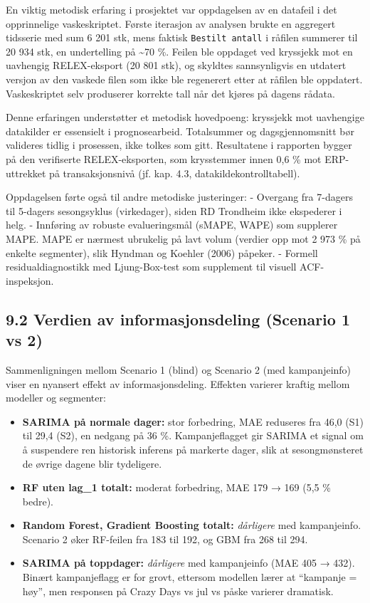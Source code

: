 \documentclass[
  norsk,
  11pt,
  a4paper,
]{article}
\providecommand{\tightlist}{%
  \setlength{\itemsep}{0pt}\setlength{\parskip}{0pt}}
\begin{document}
En viktig metodisk erfaring i prosjektet var oppdagelsen av en datafeil
i det opprinnelige vaskeskriptet. Første iterasjon av analysen brukte en
aggregert tidsserie med sum 6 201 stk, mens faktisk
\texttt{Bestilt\ antall} i råfilen summerer til 20 934 stk, en
undertelling på \textasciitilde70 \%. Feilen ble oppdaget ved kryssjekk
mot en uavhengig RELEX-eksport (20 801 stk), og skyldtes sannsynligvis
en utdatert versjon av den vaskede filen som ikke ble regenerert etter
at råfilen ble oppdatert. Vaskeskriptet selv produserer korrekte tall
når det kjøres på dagens rådata.

Denne erfaringen understøtter et metodisk hovedpoeng: kryssjekk mot
uavhengige datakilder er essensielt i prognosearbeid. Totalsummer og
dagsgjennomsnitt bør valideres tidlig i prosessen, ikke tolkes som gitt.
Resultatene i rapporten bygger på den verifiserte RELEX-eksporten, som
krysstemmer innen 0,6 \% mot ERP-uttrekket på transaksjonsnivå (jf. kap.
4.3, datakildekontrolltabell).

Oppdagelsen førte også til andre metodiske justeringer: - Overgang fra
7-dagers til 5-dagers sesongsyklus (virkedager), siden RD Trondheim ikke
ekspederer i helg. - Innføring av robuste evalueringsmål (sMAPE, WAPE)
som supplerer MAPE. MAPE er nærmest ubrukelig på lavt volum (verdier opp
mot 2 973 \% på enkelte segmenter), slik Hyndman og Koehler (2006)
påpeker. - Formell residualdiagnostikk med Ljung-Box-test som supplement
til visuell ACF-inspeksjon.

\subsection{9.2 Verdien av informasjonsdeling (Scenario 1 vs
2)}\label{verdien-av-informasjonsdeling-scenario-1-vs-2}

Sammenligningen mellom Scenario 1 (blind) og Scenario 2 (med
kampanjeinfo) viser en nyansert effekt av informasjonsdeling. Effekten
varierer kraftig mellom modeller og segmenter:

\begin{itemize}
\tightlist
\item
  \textbf{SARIMA på normale dager:} stor forbedring, MAE reduseres fra
  46,0 (S1) til 29,4 (S2), en nedgang på 36 \%. Kampanjeflagget gir
  SARIMA et signal om å suspendere ren historisk inferens på markerte
  dager, slik at sesongmønsteret de øvrige dagene blir tydeligere.
\item
  \textbf{RF uten lag\_1 totalt:} moderat forbedring, MAE 179 → 169 (5,5
  \% bedre).
\item
  \textbf{Random Forest, Gradient Boosting totalt:} \emph{dårligere} med
  kampanjeinfo. Scenario 2 øker RF-feilen fra 183 til 192, og GBM fra
  268 til 294.
\item
  \textbf{SARIMA på toppdager:} \emph{dårligere} med kampanjeinfo (MAE
  405 → 432). Binært kampanjeflagg er for grovt, ettersom modellen lærer
  at ``kampanje = høy'', men responsen på Crazy Days vs jul vs påske
  varierer dramatisk.
\end{itemize}
\end{document}

